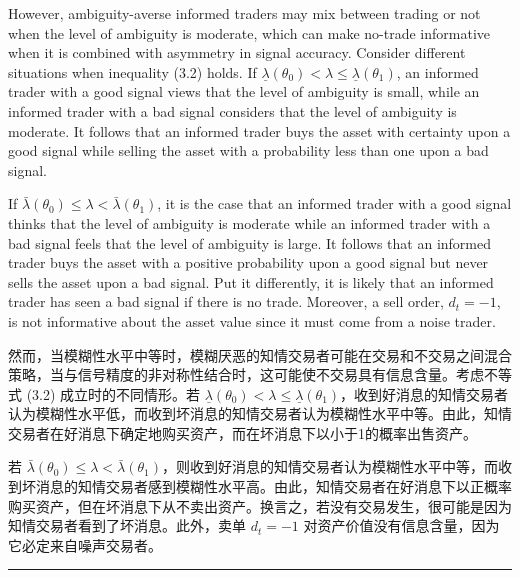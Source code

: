 \documentclass[12pt,a4paper]{article}
\newenvironment{original}{%
  \par\vspace{4pt}\noindent%
  \color{black}%
  \ignorespaces
}{%
  \par\vspace{2pt}%
}
\newenvironment{translation}{%
  \par\vspace{2pt}\noindent%
  \color{transblue}%
  \ignorespaces
}{%
  \par\vspace{4pt}\hrule\vspace{6pt}%
}
\begin{document}
\begin{original}
However, ambiguity-averse informed traders may mix between trading or not when the level of ambiguity is moderate, which can make no-trade informative when it is combined with asymmetry in signal accuracy. Consider different situations when inequality (3.2) holds. If $\underline{\lambda}(\theta_0) < \lambda \leq \underline{\lambda}(\theta_1)$, an informed trader with a good signal views that the level of ambiguity is small, while an informed trader with a bad signal considers that the level of ambiguity is moderate. It follows that an informed trader buys the asset with certainty upon a good signal while selling the asset with a probability less than one upon a bad signal.

If $\bar{\lambda}(\theta_0) \leq \lambda < \bar{\lambda}(\theta_1)$, it is the case that an informed trader with a good signal thinks that the level of ambiguity is moderate while an informed trader with a bad signal feels that the level of ambiguity is large. It follows that an informed trader buys the asset with a positive probability upon a good signal but never sells the asset upon a bad signal. Put it differently, it is likely that an informed trader has seen a bad signal if there is no trade. Moreover, a sell order, $d_t = -1$, is not informative about the asset value since it must come from a noise trader.
\end{original}
\begin{translation}
然而，当模糊性水平中等时，模糊厌恶的知情交易者可能在交易和不交易之间混合策略，当与信号精度的非对称性结合时，这可能使不交易具有信息含量。考虑不等式 (3.2) 成立时的不同情形。若 $\underline{\lambda}(\theta_0) < \lambda \leq \underline{\lambda}(\theta_1)$，收到好消息的知情交易者认为模糊性水平低，而收到坏消息的知情交易者认为模糊性水平中等。由此，知情交易者在好消息下确定地购买资产，而在坏消息下以小于1的概率出售资产。

若 $\bar{\lambda}(\theta_0) \leq \lambda < \bar{\lambda}(\theta_1)$，则收到好消息的知情交易者认为模糊性水平中等，而收到坏消息的知情交易者感到模糊性水平高。由此，知情交易者在好消息下以正概率购买资产，但在坏消息下从不卖出资产。换言之，若没有交易发生，很可能是因为知情交易者看到了坏消息。此外，卖单 $d_t = -1$ 对资产价值没有信息含量，因为它必定来自噪声交易者。
\end{translation}
\end{document}
